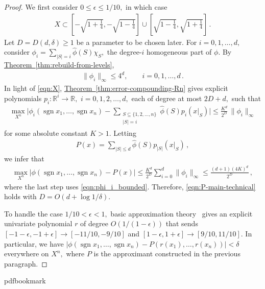 \documentclass[10pt]{article}
\theoremstyle{definition}
\numberwithin{equation}{section}
\newcommand{\R}{{\mathbb R}}
\newcommand{\expref}[2]{\texorpdfstring{\hyperref[#2]{#1~\ref{#2}}}{#1~\ref{#2}}}
\newcommand{\oneton}{\{1,2,\dots,n\}}
\DeclareMathOperator{\sign}{sgn}
\begin{document}
\begin{proof}
We first consider $0\leq\epsilon\leq1/10,$ in which
case 
\begin{align}
X\subset\left[-\sqrt{1+\frac14},-\sqrt{1-\frac14}\right]\cup
\left[\sqrt{1-\frac14},\sqrt{1+\frac14}\right]\,.
\label{eqn:X}
\end{align}
Let $D=D(d,\delta)\geq1$ be a parameter to be chosen later.
For $i=0,1,\dots,d,$ consider 
$\phi_i=\sum_{|S|=i}\hat\phi(S)\chi_S,$ the
degree-$i$ homogeneous part of $\phi$.
By \expref{Theorem}{thm:rebuild-from-levels},
\begin{align}
\label{eqn:phi_i_bounded}
\|\phi_i\|_\infty \leq 4^d, \qquad
i=0,1,\dots,d\,.
\end{align}
In light of \eqref{eqn:X}, \expref{Theorem}{thm:error-compounding-Rn} gives explicit
polynomials $p_i\colon\R^i\to\R,$
$i=0,1,2,\dots,d,$ each of degree at most $2D+d,$ such
that
\begin{align*}
\max_{X^n}\Biggl|\phi_i(\sign x_1,\dots,\sign x_n)
 - \sum_{\substack{S\subseteq\oneton\\|S|=i}}\hat\phi(S)p_i(x|_S)
 \Biggr| \leq
\frac{K^d}{2^D} \, \|\phi_i\|_\infty
\end{align*}
for some absolute constant $K>1$. 
Letting 
\begin{align*}
P(x) = \sum_{|S|\leq d}\hat\phi(S)p_{|S|}(x|_S)\,, 
\end{align*}
we infer that 
\begin{align*}
\max_{X^n}\left|\phi(\sign x_1,\dots,\sign x_n)
 - P(x)\right|
\leq
\frac{K^d}{2^D} \sum_{i=0}^d\|\phi_i\|_\infty
\leq 
\frac{(d+1)(4K)^d}{2^D}\,,
\end{align*}
where the last step uses \eqref{eqn:phi_i_bounded}.
Therefore, \eqref{eqn:P-main-technical} holds with 
$D=O(d+\log 1/\delta)$. 

To handle the case $1/10<\epsilon<1,$ basic approximation
theory~\cite{rivlin-book} gives an explicit univariate
polynomial $r$ of degree $O(1/{(1-\epsilon)})$ that sends
$[-1-\epsilon,-1+\epsilon]\to[-11/10,-9/10]$ and 
$[1-\epsilon,1+\epsilon]\to[9/10,11/10]$. In particular, we have
$\left|\phi(\sign x_1,\dots,\sign
x_n)-P(r(x_1),\dots,r(x_n))\right|<\delta$ everywhere
on $X^n,$ where $P$ is the approximant constructed in the
previous paragraph.
\end{proof}
\clearpage
\begingroup\raggedright
%
%
%
%
%
\providecommand{\bibhead}[1]{}
%
\expandafter\ifx\csname pdfbookmark\endcsname\relax%
  \providecommand{\tocrefpdfbookmark}{}
\else\providecommand{\tocrefpdfbookmark}{%
   \hypertarget{tocreferences}{}%
   \pdfbookmark[1]{References}{tocreferences}}%
\fi
\end{document}
